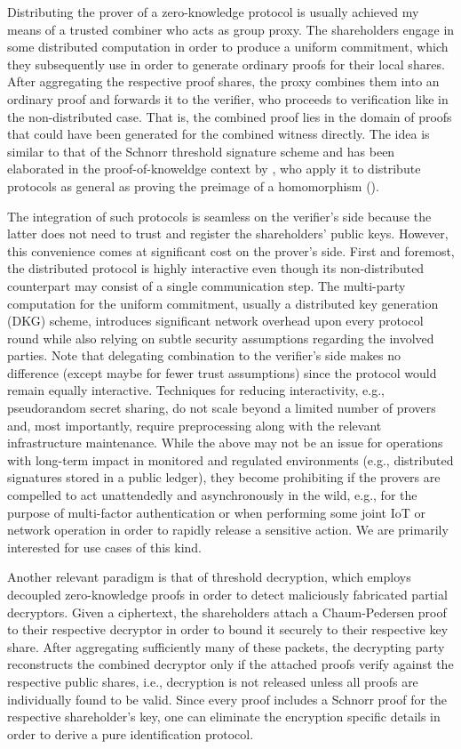 \documentclass{iacrtrans}
\begin{document}
Distributing the prover of a zero-knowledge protocol
is usually achieved my means of a trusted combiner
who acts as group proxy.
The shareholders engage in some distributed computation
in order to produce a uniform commitment,
which they subsequently use in order to generate
ordinary proofs for their local shares.
After aggregating
the respective proof shares,
the proxy combines them into an ordinary proof
and forwards it to the verifier,
who proceeds to verification like in the non-distributed case.
That is, the combined proof lies in the domain of proofs
that could have been generated for the combined witness directly.
The idea is similar to that of the
Schnorr threshold signature scheme
\cite{paper_stinson_strobl}
and has been elaborated
in the proof-of-knoweldge context by \cite{paper_threshold_zk},
who apply it to distribute protocols as general as
proving the preimage of a homomorphism (\cite{paper_homomorphism}).

The integration of such protocols
is seamless on the verifier's side
because the latter does not need
to trust and register the shareholders' public keys.
However, this convenience comes at significant cost on the prover's side.
First and foremost, the distributed protocol
is highly interactive even though its non-distributed
counterpart may consist of a single communication step.
The multi-party computation
for the uniform commitment,
usually a distributed key generation (DKG) scheme,
introduces significant network overhead upon every protocol round
while also relying on subtle
security assumptions regarding the involved parties.
Note that delegating combination
to the verifier's side makes no difference
(except maybe for fewer trust assumptions)
since the protocol would remain equally interactive.
Techniques for reducing interactivity,
e.g., pseudorandom secret sharing, do not scale beyond
a limited number of provers and,
most importantly, require preprocessing
along with the relevant infrastructure maintenance.
While the above may not be an issue
for operations with long-term impact
in monitored and regulated environments
(e.g., distributed signatures stored in a public ledger),
they become prohibiting if the provers
are compelled to act unattendedly and asynchronously
in the wild,
e.g., for the purpose of multi-factor authentication
or when performing some joint IoT or network operation
in order to rapidly release a sensitive action.
We are primarily interested for use cases of this kind.

Another relevant paradigm is that of threshold decryption,
which employs decoupled zero-knowledge proofs
in order to detect maliciously fabricated partial decryptors.
Given a ciphertext, the shareholders attach
a Chaum-Pedersen proof to their respective decryptor
in order to bound it securely to their respective key share.
After aggregating sufficiently many of these packets,
the decrypting party reconstructs the combined decryptor
only if the attached proofs verify against the respective
public shares, i.e., decryption is not released
unless all proofs are individually found to be valid.
Since every proof
includes a Schnorr proof for the respective shareholder's key,
one can eliminate the encryption specific details
in order to derive a pure identification protocol.
\end{document}
